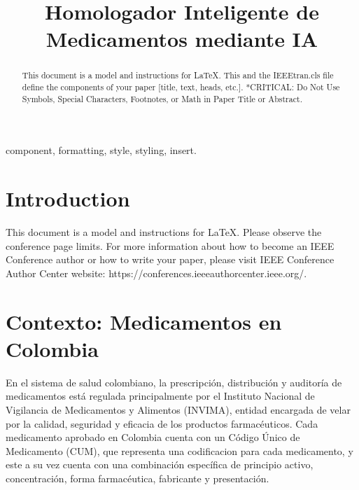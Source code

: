 \documentclass[conference]{IEEEtran}
\begin{document}
\title{Homologador Inteligente de Medicamentos mediante IA}

\author{
}

\maketitle

\begin{abstract}
This document is a model and instructions for \LaTeX.
This and the IEEEtran.cls file define the components of your paper [title, text, heads, etc.]. *CRITICAL: Do Not Use Symbols, Special Characters, Footnotes, 
or Math in Paper Title or Abstract.
\end{abstract}

\begin{IEEEkeywords}
component, formatting, style, styling, insert.
\end{IEEEkeywords}

\section{Introduction}
This document is a model and instructions for \LaTeX.
Please observe the conference page limits. For more information about how to become an IEEE Conference author or how to write your paper, please visit   IEEE Conference Author Center website: https://conferences.ieeeauthorcenter.ieee.org/.


\section{Contexto: Medicamentos en Colombia}
En el sistema de salud colombiano, la prescripción, distribución y auditoría de medicamentos está regulada principalmente por el Instituto Nacional de Vigilancia de Medicamentos y Alimentos (INVIMA), entidad encargada de velar por la calidad, seguridad y eficacia de los productos farmacéuticos. Cada medicamento aprobado en Colombia cuenta con un Código Único de Medicamento (CUM), que representa una codificacion para cada medicamento, y este a su vez cuenta con una combinación específica de principio activo, concentración, forma farmacéutica, fabricante y presentación.
\end{document}
